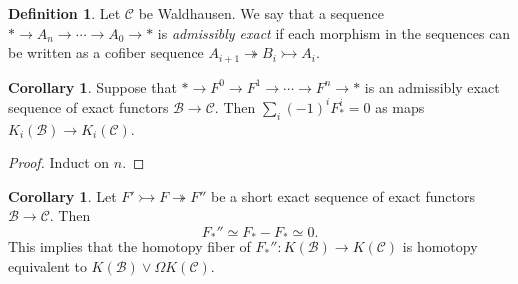 \documentclass[10pt,letterpaper,cm]{nupset}
\theoremstyle{definition}
\newtheorem{definition}{Definition}
\theoremstyle{theorem}
\newtheorem{corollary}[theorem]{Corollary}
\theoremstyle{remark}
\newcommand{\1}{\mathbf{1}}
\renewcommand{\b}{\mathscr{B}}
\renewcommand{\c}{\mathscr{C}}
\newcommand{\0}{\vec 0}
\begin{document}
\begin{definition}
Let $\c$ be Waldhausen. We say that a sequence $\ast \to A_n \to \cdots \to A_0 \to \ast$ is \textit{admissibly exact} if each morphism in the sequences can be written as a cofiber sequence $A_{i+1} \twoheadrightarrow B_i \rightarrowtail A_i$. 
\end{definition}

\begin{corollary}
Suppose that $\ast \to F^0 \to F^1 \to \cdots \to F^n \to \ast$ is an admissibly exact sequence of exact functors $\b \to \c$. Then $\sum_i ({-}1)^iF_{\ast}^i = 0$ as maps $K_i(\b) \to K_i(\c)$.
\end{corollary}
\begin{proof}
Induct on $n$.
\end{proof}

\begin{corollary}
Let $F' \rightarrowtail F \twoheadrightarrow F''$ be a short exact sequence of exact functors $\b \to \c$. Then $$F_{\ast}'' \simeq F_{\ast} - F_{\ast} \simeq 0.$$ This implies that the homotopy fiber of $F_{\ast}'' : K(\b) \to K(\c)$ is homotopy equivalent to $K(\b) \vee \Omega K(\c)$.
\end{corollary}
\end{document}
